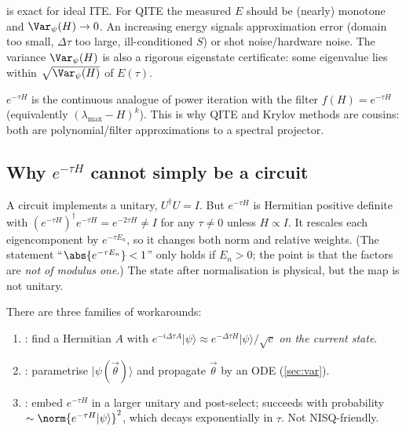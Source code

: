 \documentclass[11pt,a4paper]{article}
\newcommand{\ket}[1]{\lvert #1\rangle}
\begin{document}
\begin{remark}[Diagnostic]
 is exact for ideal ITE. For QITE the measured $E$ should be (nearly)
monotone and $\Var_\psi(H)\to0$. An increasing energy signals approximation error
(domain too small, $\Delta\tau$ too large, ill-conditioned $S$) or shot noise/hardware noise.
The variance $\Var_\psi(H)$ is also a rigorous eigenstate certificate: some eigenvalue lies within
$\sqrt{\Var_\psi(H)}$ of $E(\tau)$.
\end{remark}

\begin{remark}
$e^{-\tau H}$ is the continuous analogue of power iteration with the filter
$f(H)=e^{-\tau H}$ (equivalently $(\lambda_{\max}-H)^k$). This is why QITE and
Krylov methods are cousins: both are polynomial/filter approximations to a spectral projector.
\end{remark}

\subsection{Why $e^{-\tau H}$ cannot simply be a circuit}\label{sec:nonunitary}

A circuit implements a unitary, $U^\dagger U=I$. But $e^{-\tau H}$ is Hermitian positive
definite with $(e^{-\tau H})^\dagger e^{-\tau H}=e^{-2\tau H}\neq I$ for any $\tau\neq0$ unless
$H\propto I$. It rescales each eigencomponent by $e^{-\tau E_n}$, so it changes both norm and
relative weights. (The statement ``$\abs{e^{-\tau E_n}}<1$'' only holds if $E_n>0$; the point is
that the factors are \emph{not of modulus one}.) The state after normalisation is physical,
but the map is not unitary.

There are three families of workarounds:
\begin{enumerate}
\item {}: find a Hermitian $A$ with
$e^{-i\Delta\tau A}\ket\psi\approx e^{-\Delta\tau H}\ket\psi/\sqrt c$ \emph{on the current state}.
\item {}: parametrise $\ket{\psi(\vec\theta)}$ and
propagate $\vec\theta$ by an ODE (\cref{sec:var}).
\item {}: embed $e^{-\tau H}$ in a larger unitary
and post-select; succeeds with probability $\sim\norm{e^{-\tau H}\ket\psi}^2$, which decays
exponentially in $\tau$. Not NISQ-friendly.
\end{enumerate}
\end{document}
